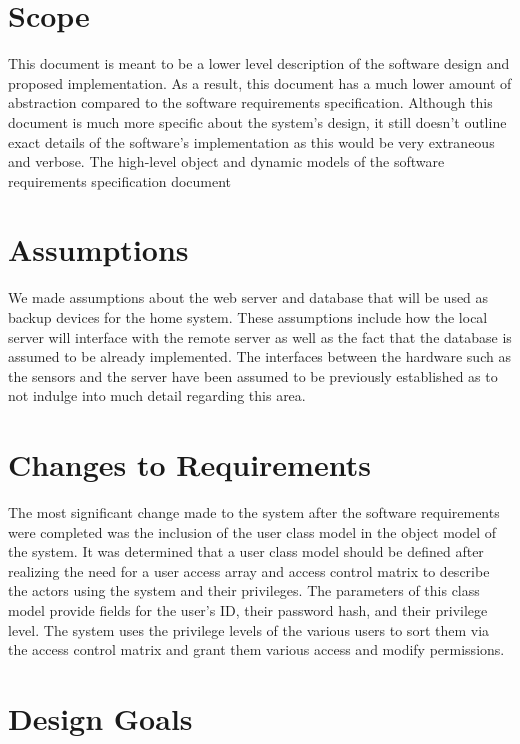 \documentclass{report}
\begin{document}
\section{Scope}

This document is meant to be a lower level description of the software design
and proposed implementation. As a result, this document has a much lower amount
of abstraction compared to the software requirements specification. Although
this document is much more specific about the system's design, it still doesn't
outline exact details of the software's implementation as this would be very
extraneous and verbose. The high-level object and dynamic models of the
software requirements specification document

\section{Assumptions}

We made assumptions about the web server and database that will be used as
backup devices for the home system. These assumptions include how the local
server will interface with the remote server as well as the fact that the
database is assumed to be already implemented. The interfaces between the
hardware such as the sensors and the server have been assumed to be previously
established as to not indulge into much detail regarding this area.

\section{Changes to Requirements}

The most significant change made to the system after the software requirements
were completed was the inclusion of the user class model in the object model of
the system. It was determined that a user class model should be defined after
realizing the need for a user access array and access control matrix to
describe the actors using the system and their privileges. The parameters of
this class model provide fields for the user's ID, their password hash, and
their privilege level. The system uses the privilege levels of the various
users to sort them via the access control matrix and grant them various access
and modify permissions.

\section{Design Goals}
\end{document}
